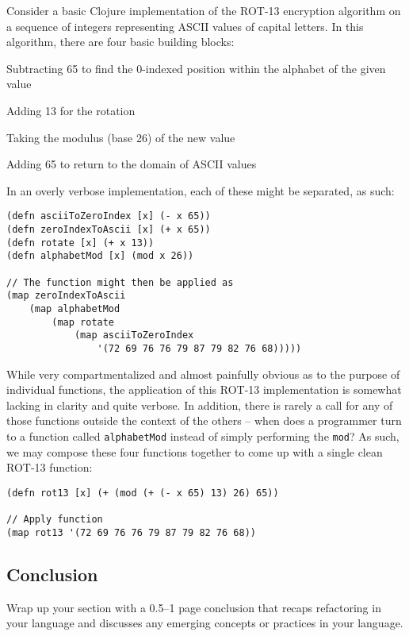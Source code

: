 \documentclass{article}
\begin{document}
Consider a basic Clojure implementation of the ROT-13 encryption algorithm on a sequence of integers representing ASCII values of capital letters. In this algorithm, there are four basic building blocks:

\begin{itemize*}
\item Subtracting 65 to find the 0-indexed position within the alphabet of the given value
\item Adding 13 for the rotation
\item Taking the modulus (base 26) of the new value
\item Adding 65 to return to the domain of ASCII values
\end{itemize*}

In an overly verbose implementation, each of these might be separated, as such:

\begin{verbatim}
(defn asciiToZeroIndex [x] (- x 65))
(defn zeroIndexToAscii [x] (+ x 65))
(defn rotate [x] (+ x 13))
(defn alphabetMod [x] (mod x 26))

// The function might then be applied as
(map zeroIndexToAscii
    (map alphabetMod
        (map rotate
            (map asciiToZeroIndex 
                '(72 69 76 76 79 87 79 82 76 68)))))
\end{verbatim}

While very compartmentalized and almost painfully obvious as to the purpose of individual functions, the application of this ROT-13 implementation is somewhat lacking in clarity and quite verbose. In addition, there is rarely a call for any of those functions outside the context of the others -- when does a programmer turn to a function called \verb!alphabetMod! instead of simply performing the \verb!mod!? As such, we may compose these four functions together to come up with a single clean ROT-13 function:

\begin{verbatim}
(defn rot13 [x] (+ (mod (+ (- x 65) 13) 26) 65))

// Apply function
(map rot13 '(72 69 76 76 79 87 79 82 76 68))
\end{verbatim}

\subsection{Conclusion}

Wrap up your section with a 0.5--1 page conclusion that recaps refactoring in your language and discusses any emerging concepts or practices in your language.
\end{document}
